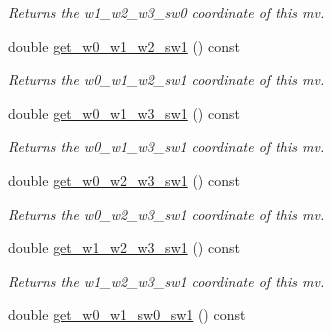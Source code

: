 \begin{DoxyCompactItemize}
\begin{DoxyCompactList}\small\item\em Returns the w1\-\_\-w2\-\_\-w3\-\_\-sw0 coordinate of this mv. \end{DoxyCompactList}\item 
\hypertarget{classe3ga_1_1mv_a5af762c64a9972f9293010d4cea1deaf}{double \hyperlink{classe3ga_1_1mv_a5af762c64a9972f9293010d4cea1deaf}{get\-\_\-w0\-\_\-w1\-\_\-w2\-\_\-sw1} () const }\label{classe3ga_1_1mv_a5af762c64a9972f9293010d4cea1deaf}

\begin{DoxyCompactList}\small\item\em Returns the w0\-\_\-w1\-\_\-w2\-\_\-sw1 coordinate of this mv. \end{DoxyCompactList}\item 
\hypertarget{classe3ga_1_1mv_ab3f8586420cd2c4c04c75de4f1981824}{double \hyperlink{classe3ga_1_1mv_ab3f8586420cd2c4c04c75de4f1981824}{get\-\_\-w0\-\_\-w1\-\_\-w3\-\_\-sw1} () const }\label{classe3ga_1_1mv_ab3f8586420cd2c4c04c75de4f1981824}

\begin{DoxyCompactList}\small\item\em Returns the w0\-\_\-w1\-\_\-w3\-\_\-sw1 coordinate of this mv. \end{DoxyCompactList}\item 
\hypertarget{classe3ga_1_1mv_a5a55613c0a717d09baa0530aabd0a16e}{double \hyperlink{classe3ga_1_1mv_a5a55613c0a717d09baa0530aabd0a16e}{get\-\_\-w0\-\_\-w2\-\_\-w3\-\_\-sw1} () const }\label{classe3ga_1_1mv_a5a55613c0a717d09baa0530aabd0a16e}

\begin{DoxyCompactList}\small\item\em Returns the w0\-\_\-w2\-\_\-w3\-\_\-sw1 coordinate of this mv. \end{DoxyCompactList}\item 
\hypertarget{classe3ga_1_1mv_a989b769322d17867e575c130419e91a0}{double \hyperlink{classe3ga_1_1mv_a989b769322d17867e575c130419e91a0}{get\-\_\-w1\-\_\-w2\-\_\-w3\-\_\-sw1} () const }\label{classe3ga_1_1mv_a989b769322d17867e575c130419e91a0}

\begin{DoxyCompactList}\small\item\em Returns the w1\-\_\-w2\-\_\-w3\-\_\-sw1 coordinate of this mv. \end{DoxyCompactList}\item 
\hypertarget{classe3ga_1_1mv_a023e678f493899e36f11b1af77e68520}{double \hyperlink{classe3ga_1_1mv_a023e678f493899e36f11b1af77e68520}{get\-\_\-w0\-\_\-w1\-\_\-sw0\-\_\-sw1} () const }\label{classe3ga_1_1mv_a023e678f493899e36f11b1af77e68520}


\end{DoxyCompactItemize}
